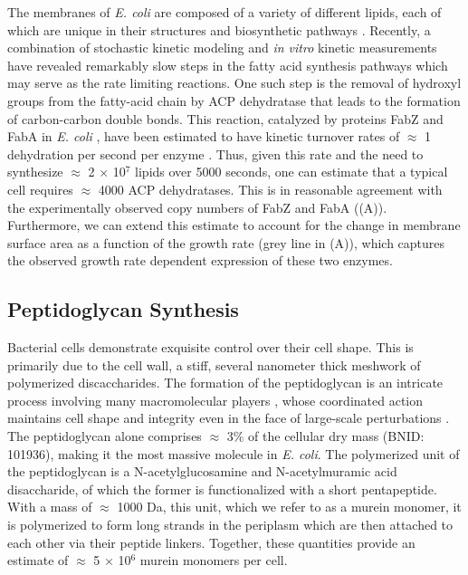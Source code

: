 The membranes of \textit{E. coli} are composed of a variety of different lipids,
each of which are unique in their structures and biosynthetic pathways
\citep{sohlenkamp2016}. Recently, a combination of stochastic kinetic modeling
\citep{ruppe2018} and \textit{in vitro} kinetic measurements
\citep{ranganathan2012, yu2011} have revealed remarkably slow steps in the fatty
acid synthesis pathways which may serve as the rate limiting reactions. One such
step is the removal of hydroxyl groups from the fatty-acid chain by ACP
dehydratase that leads to the formation of carbon-carbon double bonds. This
reaction, catalyzed by proteins FabZ and FabA in \textit{E. coli}
\citep{yu2011}, have been estimated to have kinetic turnover rates of $\approx$
1 dehydration per second per enzyme \citep{ruppe2018}. Thus, given this rate and
the need to synthesize $\approx$ 2 $\times$ 10$^7$ lipids over 5000 seconds, one
can estimate that a typical cell requires $\approx$ 4000 ACP dehydratases. This
is in reasonable agreement with the experimentally observed copy numbers of FabZ
and FabA ((A)). Furthermore, we can extend this estimate to
account for the change in membrane surface area as a function of the growth rate
(grey line in (A)), which captures the observed growth rate
dependent expression of these two enzymes.


\subsection{Peptidoglycan Synthesis}
Bacterial cells demonstrate exquisite control over their cell shape. This is
primarily due to the cell wall, a stiff, several nanometer thick meshwork of
polymerized discaccharides. The formation of the peptidoglycan is an intricate
process involving many macromolecular players \citep{shi2018, morgenstein2015},
whose coordinated action maintains cell shape and integrity even in the face of
large-scale perturbations \citep{harris2018,shi2018}.
The peptidoglycan alone comprises $\approx$ 3\% of the cellular dry mass (BNID:
101936), making it the most massive molecule in \textit{E. coli}. The
polymerized unit of the peptidoglycan is a N-acetylglucosamine and
N-acetylmuramic acid disaccharide, of which the former is functionalized with a
short pentapeptide. With a mass of $\approx$ 1000 Da, this unit, which we refer
to as a murein monomer, it is polymerized to form long strands in the periplasm
which are then attached to each other via their peptide linkers. Together, these
quantities provide an estimate of $\approx$ 5 $\times$ 10$^6$ murein monomers
per cell.

